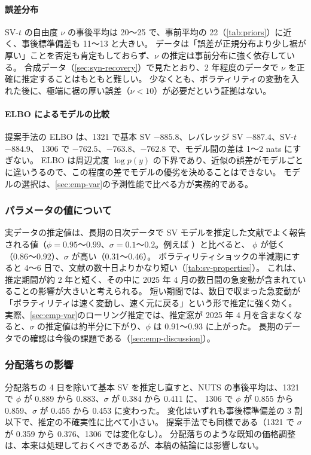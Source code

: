 \paragraph{誤差分布}
SV-$t$ の自由度 $\nu$ の事後平均は 20〜25 で、事前平均の 22（\cref{tab:priors}）に近く、事後標準偏差も 11〜13 と大きい。
データは「誤差が正規分布より少し裾が厚い」ことを否定も肯定もしておらず、$\nu$ の推定は事前分布に強く依存している。
合成データ（\cref{sec:syn-recovery}）で見たとおり、2 年程度のデータで $\nu$ を正確に推定することはもともと難しい。
少なくとも、ボラティリティの変動を入れた後に、極端に裾の厚い誤差（$\nu < 10$）が必要だという証拠はない。

\paragraph{ELBO によるモデルの比較}
提案手法の ELBO は、1321 で基本 SV $-885.8$、レバレッジ SV $-887.4$、SV-$t$ $-884.9$、
1306 で $-762.5$、$-763.8$、$-762.8$ で、モデル間の差は 1〜2 nats にすぎない。
ELBO は周辺尤度 $\log p(y)$ の下界であり、近似の誤差がモデルごとに違いうるので、この程度の差でモデルの優劣を決めることはできない。
モデルの選択は、\cref{sec:emp-var}の予測性能で比べる方が実務的である。

\subsubsection{パラメータの値について}

実データの推定値は、長期の日次データで SV モデルを推定した文献でよく報告される値（$\phi = 0.95$〜$0.99$、$\sigma = 0.1$〜$0.2$。例えば \textcite{kim1998}）と比べると、
$\phi$ が低く（0.86〜0.92）、$\sigma$ が高い（0.31〜0.46）。
ボラティリティショックの半減期にすると 4〜6 日で、文献の数十日よりかなり短い（\cref{tab:sv-properties}）。
これは、推定期間が約 2 年と短く、その中に 2025 年 4 月の数日間の急変動が含まれていることの影響が大きいと考えられる。
短い期間では、数日で収まった急変動が「ボラティリティは速く変動し、速く元に戻る」という形で推定に強く効く。
実際、\cref{sec:emp-var}のローリング推定では、推定窓が 2025 年 4 月を含まなくなると、$\sigma$ の推定値は約半分に下がり、$\phi$ は 0.91〜0.93 に上がった。
長期のデータでの確認は今後の課題である（\cref{sec:emp-discussion}）。

\subsubsection{分配落ちの影響}

分配落ちの 4 日を除いて基本 SV を推定し直すと、NUTS の事後平均は、1321 で $\phi$ が 0.889 から 0.883、$\sigma$ が 0.384 から 0.411 に、
1306 で $\phi$ が 0.855 から 0.859、$\sigma$ が 0.455 から 0.453 に変わった。
変化はいずれも事後標準偏差の 3 割以下で、推定の不確実性に比べて小さい。
提案手法でも同様である（1321 で $\sigma$ が 0.359 から 0.376、1306 では変化なし）。
分配落ちのような既知の価格調整は、本来は処理しておくべきであるが、本稿の結論には影響しない。

